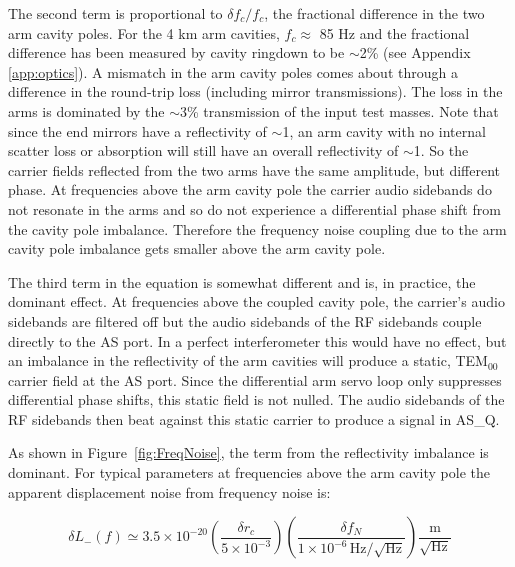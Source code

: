 The second term is proportional to $\delta f_{c}/f_{c}$, the fractional
difference in the two arm cavity poles. For the 4 km arm cavities, 
$f_{c} \approx $ 85 Hz and the fractional difference has been
measured by cavity ringdown to be $\sim$2\% (see Appendix \ref{app:optics}). 
A mismatch in the arm cavity poles
comes about through a difference in the round-trip loss (including mirror
transmissions). The loss in the arms
is dominated by the $\sim$3\% transmission of the input test masses. Note that since
the end mirrors have a reflectivity of $\sim$1, an arm cavity with no internal
scatter loss or absorption will still have an overall reflectivity of $\sim$1. So
the carrier fields reflected from the two arms have the same amplitude, but
different phase. At frequencies above the arm cavity pole the carrier audio
sidebands do not resonate in the arms and so do not experience a differential
phase shift from the cavity pole imbalance. Therefore the frequency noise
coupling due to the arm cavity pole imbalance gets smaller above the arm cavity pole.

The third term in the equation is somewhat different and is, in practice,
the dominant effect. At frequencies
above the coupled cavity pole, the carrier's audio sidebands are filtered off
but the audio sidebands of the RF sidebands couple directly to the AS port.
In a perfect interferometer this would have no effect, but an imbalance in
the reflectivity of the arm cavities will produce a static, TEM$_{00}$ carrier
field at the AS port. Since the differential arm servo loop only suppresses
differential phase shifts, this static field is not nulled. The audio sidebands
of the RF sidebands then beat against this static carrier to produce a signal
in AS\_Q.

As shown in Figure~\ref{fig:FreqNoise}, the term from the reflectivity
imbalance is dominant. For typical parameters at frequencies above the arm
cavity pole the apparent displacement noise from frequency noise is:

\begin{equation}
\delta L_{-}(f) \simeq 3.5 \times 10^{-20} 
                  \left(\frac{\delta r_c}{5 \times 10^{-3}}\right)  
             \left(\frac{\delta f_N}{1 \times 10^{-6} \, \mbox{Hz}/\sqrt{\mbox{Hz}}}\right)
                  \frac{\mbox{m}}{\sqrt{\mbox{Hz}}}
\end{equation}

